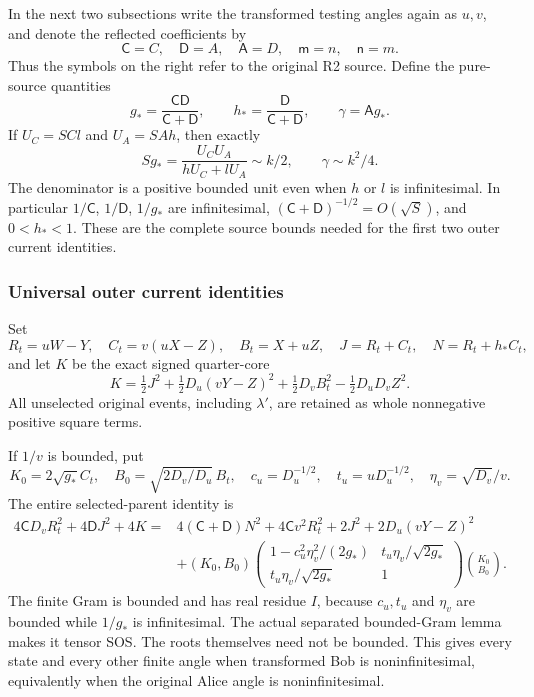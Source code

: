 In the next two subsections write the transformed testing angles again
as $u,v$, and denote the reflected coefficients by
\[
\mathsf C=C,\quad\mathsf D=A,\quad\mathsf A=D,
\quad\mathsf m=n,\quad\mathsf n=m.
\]
Thus the symbols on the right refer to the original R2 source.
Define the pure-source quantities
\[
g_* =\frac{\mathsf C\mathsf D}{\mathsf C+\mathsf D},\qquad
h_* =\frac{\mathsf D}{\mathsf C+\mathsf D},\qquad
\gamma=\mathsf A g_*.
\tag{R2O7}
\]
If $U_C=SC l$ and $U_A=SAh$, then exactly
\[
Sg_* =\frac{U_CU_A}{hU_C+lU_A}\sim k/2,
\qquad \gamma\sim k^2/4.
\tag{R2O8}
\]
The denominator is a positive bounded unit even when $h$ or $l$ is
infinitesimal.  In particular $1/\mathsf C$, $1/\mathsf D$,
$1/g_*$ are infinitesimal,
$(\mathsf C+\mathsf D)^{-1/2}=O(\sqrt S)$, and $0<h_*<1$.
These are the complete source bounds needed for the first two outer
current identities.

\subsubsection*{Universal outer current identities}

Set
\[
R_t=uW-Y,\quad C_t=v(uX-Z),\quad B_t=X+uZ,\quad
J=R_t+C_t,\quad N=R_t+h_*C_t,
\]
and let $K$ be the exact signed quarter-core
\[
K=\tfrac12J^2+\tfrac12D_u(vY-Z)^2
 +\tfrac12D_vB_t^2-\tfrac12D_uD_vZ^2.
\tag{R2O9}
\]
All unselected original events, including $\lambda'$, are retained
as whole nonnegative positive square terms.

If $1/v$ is bounded, put
\[
K_0=2\sqrt{g_*}C_t,\quad B_0=\sqrt{2D_v/D_u}\,B_t,
\quad c_u=D_u^{-1/2},\quad t_u=uD_u^{-1/2},\quad
\eta_v=\sqrt{D_v}/v.
\]
The entire selected-parent identity is
\begin{align*}
4\mathsf C D_vR_t^2+4\mathsf D J^2+4K
={}&4(\mathsf C+\mathsf D)N^2+4\mathsf C v^2R_t^2
 +2J^2+2D_u(vY-Z)^2\\
&+(K_0,B_0)
\begin{pmatrix}
1-c_u^2\eta_v^2/(2g_*)&t_u\eta_v/\sqrt{2g_*}\\
t_u\eta_v/\sqrt{2g_*}&1
\end{pmatrix}
\binom{K_0}{B_0}.
\tag{R2O10}
\end{align*}
The finite Gram is bounded and has real residue $I$, because $c_u,t_u$
and $\eta_v$ are bounded while $1/g_*$ is infinitesimal.  The actual
separated bounded-Gram lemma makes it tensor SOS.  The roots themselves
need not be bounded.  This gives every state and every other finite angle
when transformed Bob is noninfinitesimal, equivalently when the original
Alice angle is noninfinitesimal.

